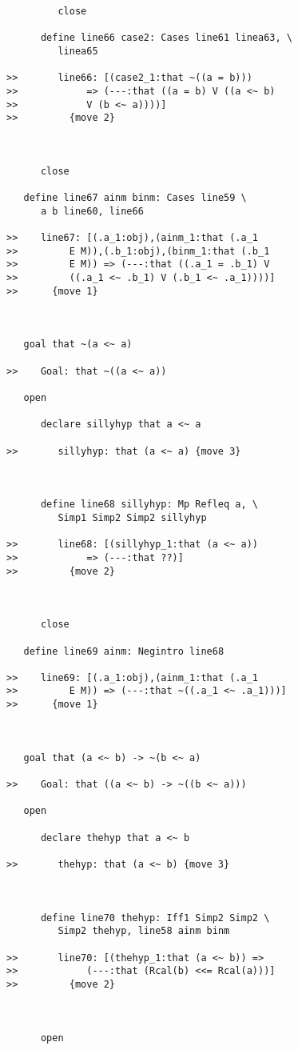 \documentclass[12pt]{article}
\begin{document}
\begin{verbatim}
         close

      define line66 case2: Cases line61 linea63, \
         linea65

>>       line66: [(case2_1:that ~((a = b)))
>>            => (---:that ((a = b) V ((a <~ b)
>>            V (b <~ a))))]
>>         {move 2}



      close

   define line67 ainm binm: Cases line59 \
      a b line60, line66

>>    line67: [(.a_1:obj),(ainm_1:that (.a_1
>>         E M)),(.b_1:obj),(binm_1:that (.b_1
>>         E M)) => (---:that ((.a_1 = .b_1) V
>>         ((.a_1 <~ .b_1) V (.b_1 <~ .a_1))))]
>>      {move 1}



   goal that ~(a <~ a)

>>    Goal: that ~((a <~ a))

   open

      declare sillyhyp that a <~ a

>>       sillyhyp: that (a <~ a) {move 3}



      define line68 sillyhyp: Mp Refleq a, \
         Simp1 Simp2 Simp2 sillyhyp

>>       line68: [(sillyhyp_1:that (a <~ a))
>>            => (---:that ??)]
>>         {move 2}



      close

   define line69 ainm: Negintro line68

>>    line69: [(.a_1:obj),(ainm_1:that (.a_1
>>         E M)) => (---:that ~((.a_1 <~ .a_1)))]
>>      {move 1}



   goal that (a <~ b) -> ~(b <~ a)

>>    Goal: that ((a <~ b) -> ~((b <~ a)))

   open

      declare thehyp that a <~ b

>>       thehyp: that (a <~ b) {move 3}



      define line70 thehyp: Iff1 Simp2 Simp2 \
         Simp2 thehyp, line58 ainm binm

>>       line70: [(thehyp_1:that (a <~ b)) =>
>>            (---:that (Rcal(b) <<= Rcal(a)))]
>>         {move 2}



      open


\end{verbatim}
\end{document}
